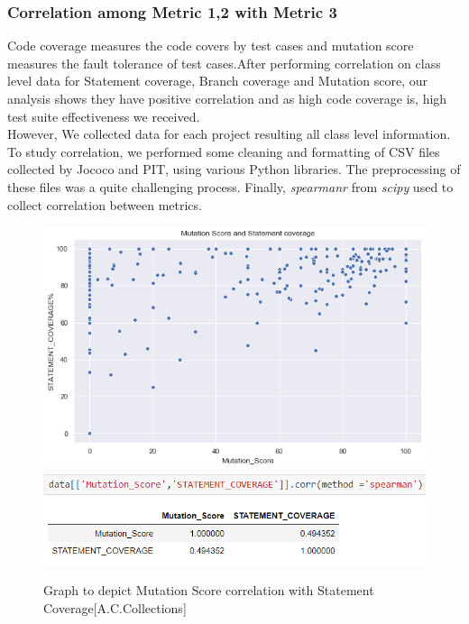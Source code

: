 \documentclass[letterpaper, 12 pt, conference]{ieeetran}  %
\begin{document}
\subsubsection{Correlation among Metric 1,2 with Metric 3 }
Code coverage measures the code covers by test cases and mutation score measures the fault tolerance of test cases.After performing correlation on class level data for Statement coverage, Branch coverage and Mutation score, our analysis shows they have positive correlation and as high code coverage is, high test suite effectiveness we received. \\However, We collected data for each project resulting all class level information. To study correlation, we performed some cleaning and formatting of CSV files collected by Jococo and PIT, using various Python libraries. The preprocessing of these files was a quite challenging process. Finally, \textit{spearmanr} from \textit{scipy} used to collect correlation between metrics.
\begin{figure}[H]
    \centering
     \includegraphics[scale=0.40]{metric3 vs 1 commons-collections.png}%
     \\ \includegraphics[scale=0.60]{metric3 vs 1 commons-collections_spearmanr.png} %
    \caption{Graph to depict Mutation Score correlation with Statement Coverage{\footnotesize[A.C.Collections]}}
\end{figure}
\end{document}
